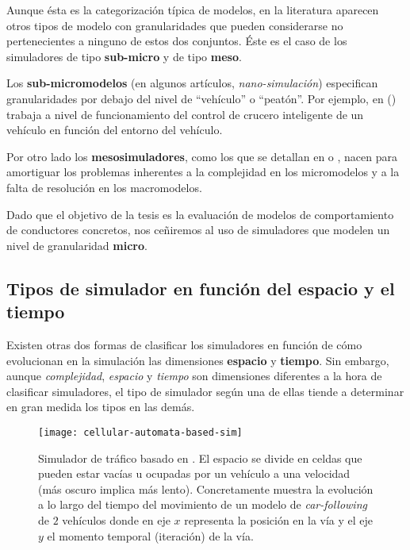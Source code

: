 Aunque ésta es la categorización típica de modelos, en la literatura aparecen otros tipos de modelo con granularidades que pueden considerarse no pertenecientes a ninguno de estos dos conjuntos. Éste es el caso de los simuladores de tipo \textbf{sub-micro} y de tipo \textbf{meso}.

Los \textbf{sub-micromodelos} (en algunos artículos, \textit{nano-simulación}) especifican granularidades por debajo del nivel de \enquote{vehículo} o \enquote{peatón}. Por ejemplo, en (\cite{Minderhoud1999}) trabaja a nivel de funcionamiento del control de crucero inteligente de un vehículo en función del entorno del vehículo.

Por otro lado los \textbf{mesosimuladores}, como los que se detallan en \cite{munoz2001integrated} o \cite{casas2011need}, nacen para amortiguar los problemas inherentes a la complejidad en los micromodelos y a la falta de resolución en los macromodelos.

Dado que el objetivo de la tesis es la evaluación de modelos de comportamiento de conductores concretos, nos ceñiremos al uso de simuladores que modelen un nivel de granularidad \textbf{micro}.

\subsection{Tipos de simulador en función del espacio y el tiempo}

Existen otras dos formas de clasificar los simuladores en función de cómo evolucionan en la simulación las dimensiones \textbf{espacio} y  \textbf{tiempo}. Sin embargo, aunque \textit{complejidad}, \textit{espacio} y \textit{tiempo} son dimensiones diferentes a la hora de clasificar simuladores, el tipo de simulador según una de ellas tiende a determinar en gran medida los tipos en las demás.

\begin{figure}
	\centering
	\texttt{[image: cellular-automata-based-sim]}
	\caption[Ejemplo de simulador basado en ]{Simulador de tráfico basado en . El espacio se divide en celdas que pueden estar vacías u ocupadas por un vehículo a una velocidad (más oscuro implica más lento). Concretamente muestra la evolución a lo largo del tiempo del movimiento de un modelo de \textit{\gls{car-following}} de $2$ vehículos donde en eje $x$ representa la posición en la vía y el eje $y$ el momento temporal (iteración) de la vía.}
	\label{fig:cellular-automata-based-sim}
\end{figure}

